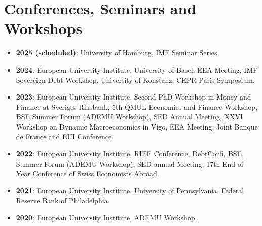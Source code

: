 \documentclass[letterpaper,11pt]{article}
\makeatletter
\newcommand{\resumeItem}[2]{
  \item\small{
    \textbf{#1}{: #2 \vspace{-2pt}}
  }
}
\newcommand{\resumeSubheading}[4]{
  \vspace{-1pt}\item
    \begin{tabular*}{0.97\textwidth}{l@{\extracolsep{\fill}}r}
      \textbf{#1} & #2 \\
      \textit{\small#3} & \textit{\small #4} \\
    \end{tabular*}\vspace{-5pt}
}
\newcommand{\resumeSubItem}[2]{\resumeItem{#1}{#2}\vspace{-1pt}}
\newcommand{\resumeSubHeadingListStart}{\begin{itemize}[leftmargin=*]}
\newcommand{\resumeSubHeadingListEnd}{\end{itemize}}
\makeatother
\begin{document}
\section{Conferences, Seminars and Workshops}
\resumeSubHeadingListStart
\resumeSubItem{2025 (scheduled)}{University of Hamburg, IMF Seminar Series.}
\resumeSubItem{2024}{European University Institute, University of Basel, EEA Meeting, IMF Sovereign Debt Workshop, University of Konstanz, CEPR Paris Symposium.}
\resumeSubItem{2023}{European University Institute, Second PhD Workshop in Money and Finance at Sveriges Riksbank, 5th QMUL Economics and Finance Workshop, BSE Summer Forum (ADEMU Workshop), SED Annual Meeting, XXVI Workshop on Dynamic Macroeconomics in Vigo, EEA Meeting, Joint Banque de France and EUI Conference.}
\resumeSubItem{2022}{European University Institute, RIEF Conference, DebtCon5, BSE Summer Forum (ADEMU Workshop), SED annual Meeting, 17th End-of-Year Conference of Swiss Economists Abroad.}
\resumeSubItem{2021}{European University Institute, University of Pennsylvania, Federal Reserve Bank of Philadelphia.}
\resumeSubItem{2020}{European University Institute, ADEMU Workshop.}
\resumeSubHeadingListEnd

%










\end{document}

